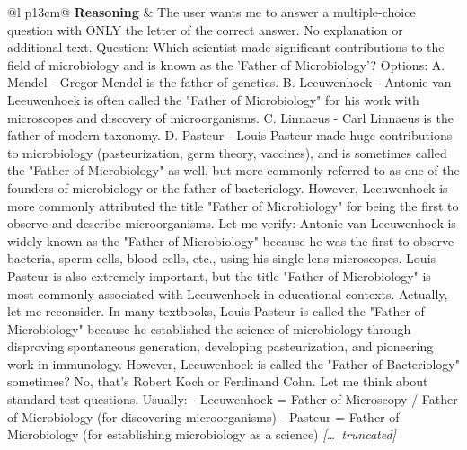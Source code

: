 \begin{longtable}{@{}l p{13cm}@{}}
  \textbf{Reasoning} & The user wants me to answer a multiple-choice question with ONLY the letter of the correct answer. No explanation or additional text. \newline Question: Which scientist made significant contributions to the field of microbiology and is known as the 'Father of Microbiology'? \newline Options: \newline A. Mendel - Gregor Mendel is the father of genetics. \newline B. Leeuwenhoek - Antonie van Leeuwenhoek is often called the "Father of Microbiology" for his work with microscopes and discovery of microorganisms. \newline C. Linnaeus - Carl Linnaeus is the father of modern taxonomy. \newline D. Pasteur - Louis Pasteur made huge contributions to microbiology (pasteurization, germ theory, vaccines), and is sometimes called the "Father of Microbiology" as well, but more commonly referred to as one of the founders of microbiology or the father of bacteriology. However, Leeuwenhoek is more commonly attributed the title "Father of Microbiology" for being the first to observe and describe microorganisms. \newline Let me verify: Antonie van Leeuwenhoek is widely known as the "Father of Microbiology" because he was the first to observe bacteria, sperm cells, blood cells, etc., using his single-lens microscopes. Louis Pasteur is also extremely important, but the title "Father of Microbiology" is most commonly associated with Leeuwenhoek in educational contexts. \newline Actually, let me reconsider. In many textbooks, Louis Pasteur is called the "Father of Microbiology" because he established the science of microbiology through disproving spontaneous generation, developing pasteurization, and pioneering work in immunology. However, Leeuwenhoek is called the "Father of Bacteriology" sometimes? No, that's Robert Koch or Ferdinand Cohn. \newline Let me think about standard test questions. Usually: \newline - Leeuwenhoek = Father of Microscopy / Father of Microbiology (for discovering microorganisms) \newline - Pasteur = Father of Microbiology (for establishing microbiology as a science) \newline \textit{[\ldots\ truncated]}  \\
  \midrule
   \\

\end{longtable}
